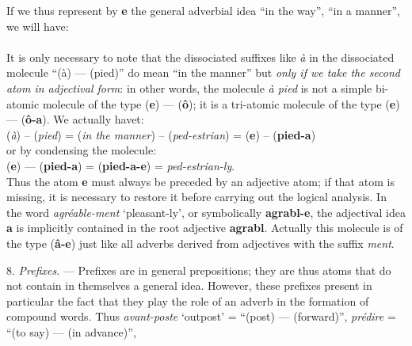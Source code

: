 \begin{sloppypar}
{  }
%
  {\small
    If we thus represent by \textbf{e} the general adverbial idea ``in
    the way'', ``in a manner'', we will have:\\[1ex]

    \noindent
    \\[1ex]
  
    It is only necessary to note that the dissociated suffixes like
    \emph{à} in the dissociated molecule ``(à) --- (pied)'' do mean
    ``in the manner'' but \emph{only if we take the second atom in
      adjectival form}: in other words, the molecule \emph{à pied} is
    not a simple bi-atomic molecule of the type (\textbf{e}) —
    (\textbf{ô}); it is a tri-atomic molecule of the type (\textbf{e})
    ---
    (\textbf{ô-a}). We actually havet:\\[1ex]

    \noindent
    (\emph{à}) -- (\emph{pied}) = (\emph{in the manner}) --
    (\emph{ped-estrian}) = (\textbf{e}) -- (\textbf{pied-a})\\[1ex]
      
    \noindent
    or by condensing the molecule:\\[1ex]
      
    \noindent
    (\textbf{e}) — (\textbf{pied-a}) = (\textbf{pied-a-e}) =
    \emph{ped-estrian-ly}.\\[1ex]

    Thus the atom \textbf{e} must always be preceded by an adjective
    atom; if that atom is missing, it is necessary to restore it
    before carrying out the logical analysis. In the word
    \emph{agréable-ment} `pleasant-ly', or symbolically
    \textbf{agrabl-e}, the adjectival idea \textbf{a} is implicitly
    contained in the root adjective \textbf{agrabl}. Actually this
    molecule is of the type (\textbf{â-e}) just like all adverbs
    derived from adjectives with the suffix \emph{ment}.

    8. \emph{Prefixes}. --- Prefixes are in general prepositions; they
    are thus atoms that do not contain in themselves a general idea.
    However, these prefixes present in particular the fact that they
    play the role of an adverb in the formation of compound
    words. Thus \emph{avant-poste} `outpost' = ``(post) --- (forward)'',
    \emph{prédire} = ``(to say) --- (in advance)'',
    

}
\end{sloppypar}
